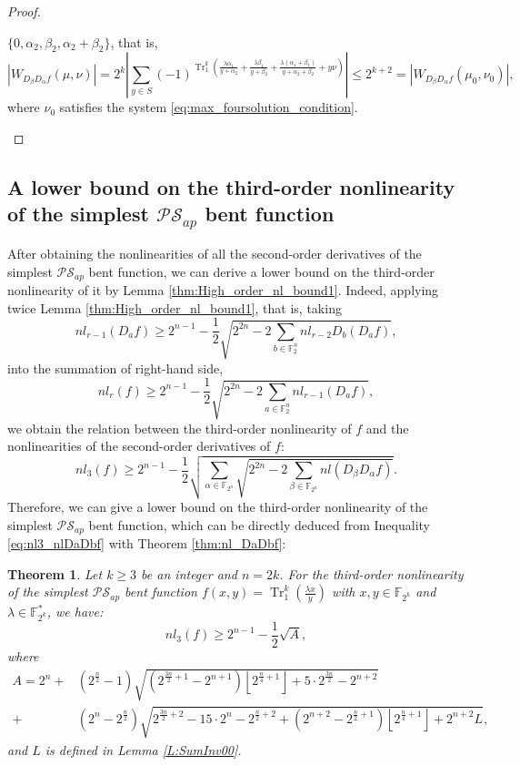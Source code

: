\documentclass{article}
\newcommand{\F}{\mathbb{F}}
\newcommand{\0}{\textbf{0}}
\newcommand{\1}{\textbf{1}}
\newcommand{\TRACE}{\operatorname{Tr}_1^k}
\theoremstyle{plain}
\newtheorem{theorem}{Theorem}
\begin{document}
\begin{proof}
\begin{enumerate}[label=\textbf{Case \arabic*},wide = 0pt]
            $\{0,\alpha_2,\beta_2,\alpha_2+\beta_2\}$, that is,
            \[ |W_{D_{\beta}D_{\alpha}f}(\mu,\nu)|=2^k\left\lvert\sum_{y\in S}(-1)^{\TRACE\left(\frac{\lambda\alpha_1}{y+\alpha_2}+\frac{\lambda\beta_1}{y+\beta_2}+\frac{\lambda(\alpha_1+\beta_1)}{y+\alpha_2+\beta_2}+ y\nu\right)}\right\rvert\le 2^{k+2}=|W_{D_{\beta}D_{\alpha}f}(\mu_0,\nu_0)|, \]
            where $\nu_0$ satisfies the system \eqref{eq:max_foursolution_condition}.
        \end{enumerate}
    \end{proof}

\subsection{A lower bound on the third-order nonlinearity of the simplest $\mathcal{PS}_{ap}$ bent function}
    After obtaining the nonlinearities of all the second-order derivatives of the simplest $\mathcal{PS}_{ap}$ bent function, we can derive a lower bound on the third-order nonlinearity of it by Lemma \ref{thm:High_order_nl_bound1}.
    Indeed, applying twice Lemma \ref{thm:High_order_nl_bound1}, that is, taking
    \[nl_{r-1}(D_af) \ge 2^{n-1}-\frac{1}{2}\sqrt{2^{2n}-2\sum_{b\in\F_2^n}nl_{r-2}D_b(D_af)},\]
    into the summation  of right-hand side,
    \[nl_r(f) \ge 2^{n-1}-\frac{1}{2}\sqrt{2^{2n}-2\sum_{a\in\F_2^n}nl_{r-1}(D_af)},\]
    we obtain the relation between the third-order nonlinearity of $f$ and the nonlinearities of the second-order derivatives of $f$:
    \begin{equation}\label{eq:nl3_nlDaDbf}
        nl_3(f)\ge 2^{n-1}-\frac{1}{2}\sqrt{\sum_{\alpha\in\F_{2^n}}\sqrt{2^{2n}-2\sum_{\beta\in\F_{2^n}} nl(D_{\beta}D_{\alpha}f)}}.
    \end{equation}
    Therefore, we can give a lower bound on the third-order nonlinearity of the simplest $\mathcal{PS}_{ap}$ bent function, which can be directly deduced from Inequality \eqref{eq:nl3_nlDaDbf} with Theorem \ref{thm:nl_DaDbf}:
    \begin{theorem}\label{th:our_lower_bound}
        Let $k\ge 3$ be an integer and $n=2k$. For the third-order nonlinearity of the simplest $\mathcal{PS}_{ap}$ bent function $f(x,y)=\TRACE(\frac{\lambda x}{y})$ with $x,y\in\F_{2^k}$ and $\lambda\in\F_{2^k}^*$, we have:
        \[nl_3(f)\ge 2^{n-1}-\frac{1}{2}\sqrt{A},\]
        where
        \begin{align*}
            A=2^n+&(2^{\frac{n}{2}}-1)\sqrt{(2^{\frac{3n}{2}+1}-2^{n+1})\left\lfloor 2^{\frac{n}{4}+1}\right\rfloor+5\cdot 2^{\frac{3n}{2}}-2^{n+2}}\\
            +&(2^n-2^{\frac{n}{2}})\sqrt{2^{\frac{3n}{2}+2}-15\cdot 2^n-2^{\frac{n}{2}+2}+(2^{n+2}-2^{\frac{n}{2}+1})\left\lfloor 2^{\frac{n}{4}+1}\right\rfloor+2^{n+2}L},
        \end{align*}
        and $L$ is defined in Lemma \ref{L:SumInv00}.
    \end{theorem}
\end{document}
